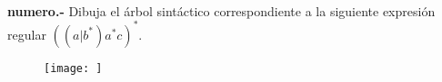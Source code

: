 \paragraph{}
\textbf{{numero}.-} Dibuja el árbol sintáctico correspondiente a la siguiente expresión regular $ ((a|b^*)a^*c)^* $. 
\begin{figure}[ht!]
\centering
\texttt{[image: ]}
\end{figure}
